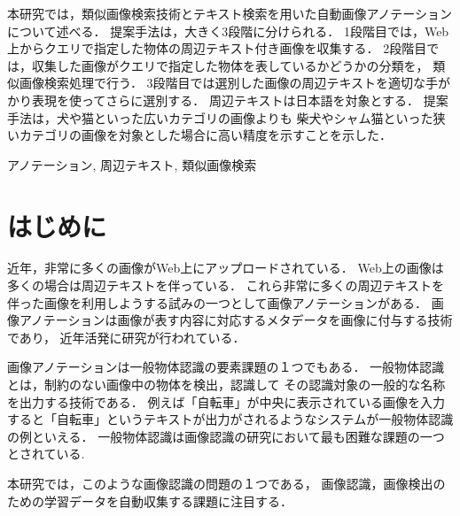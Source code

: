 \documentclass{deimj}
\begin{document}
\pagestyle{empty}
\begin{jabstract}
本研究では，類似画像検索技術とテキスト検索を用いた自動画像アノテーションについて述べる．
提案手法は，大きく3段階に分けられる．
1段階目では，Web上からクエリで指定した物体の周辺テキスト付き画像を収集する．
2段階目では，収集した画像がクエリで指定した物体を表しているかどうかの分類を，
類似画像検索処理で行う．
3段階目では選別した画像の周辺テキストを適切な手がかり表現を使ってさらに選別する．
周辺テキストは日本語を対象とする．
提案手法は，犬や猫といった広いカテゴリの画像よりも
柴犬やシャム猫といった狭いカテゴリの画像を対象とした場合に高い精度を示すことを示した．

\end{jabstract}
\begin{jkeyword}
アノテーション, 周辺テキスト, 類似画像検索
\end{jkeyword}
\maketitle

\section{はじめに}
\label{sec:intro}
近年，非常に多くの画像がWeb上にアップロードされている．
Web上の画像は多くの場合は周辺テキストを伴っている．
これら非常に多くの周辺テキストを伴った画像を利用しようする試みの一つとして画像アノテーションがある．
画像アノテーションは画像が表す内容に対応するメタデータを画像に付与する技術であり，
近年活発に研究が行われている\cite{jeon,watanabe}．

画像アノテーションは一般物体認識の要素課題の１つでもある．
一般物体認識とは，制約のない画像中の物体を検出，認識して
その認識対象の一般的な名称を出力する技術である．
例えば「自転車」が中央に表示されている画像を入力すると「自転車」というテキストが出力がされるようなシステムが一般物体認識の例といえる．
一般物体認識は画像認識の研究において最も困難な課題の一つとされている\cite{yanai}.

%
本研究では，このような画像認識の問題の１つである，
画像認識，画像検出のための学習データを自動収集する課題に注目する．
\end{document}
